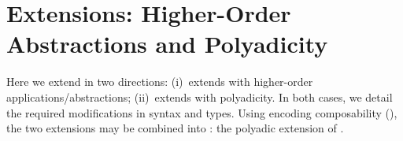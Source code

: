\documentclass[runningheads]{llncs}
\begin{document}
{





\section{Extensions: Higher-Order Abstractions and Polyadicity}
\label{sec:extension}
%

Here we extend \HOp in two directions: %
(i)~\HOpp  extends   \HOp with higher-order applications/abstractions;
(ii)~\PHOp   extends  \HOp
with polyadicity.
In both cases, we detail the
required modifications in syntax and types.
Using encoding composability (), 
the two extensions may be combined into \PHOpp: the polyadic extension of \HOpp.


}
\end{document}

